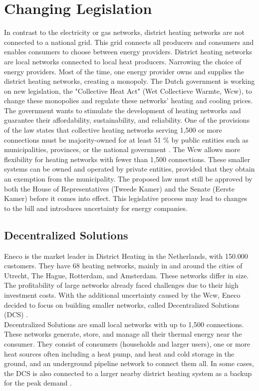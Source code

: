 \section{Changing Legislation}
In contrast to the electricity or gas networks, district heating networks are not connected to a national grid. This grid connects all producers and consumers and enables consumers to choose between energy providers. District heating networks are local networks connected to local heat producers. Narrowing the choice of energy providers. Most of the time, one energy provider owns and supplies the district heating networks, creating a monopoly. The Dutch government is working on new legislation, the "Collective Heat Act" (Wet Collectieve Warmte, Wcw), to change these monopolies and regulate these networks' heating and cooling prices. The government wants to stimulate the development of heating networks and guarantee their affordability, sustainability, and reliability. One of the provisions of the law states that collective heating networks serving 1,500 or more connections must be majority-owned for at least 51 $\%$ by public entities such as municipalities, provinces, or the national government \cite{WcWsite}. The Wcw allows more flexibility for heating networks with fewer than 1,500 connections. These smaller systems can be owned and operated by private entities, provided that they obtain an exemption from the municipality. The proposed law
must still be approved by both the House of Representatives (Tweede Kamer) and the Senate (Eerste Kamer) before it comes into effect. This legislative process may lead to changes to the bill and introduces uncertainty for energy companies.

\subsection{Decentralized Solutions}
Eneco is the market leader in District Heating in the Netherlands, with 150.000 customers. They have 68 heating networks, mainly in and around the cities of Utrecht, The Hague, Rotterdam, and Amsterdam. These networks differ in size. The profitability of large networks already faced challenges due to their high investment costs. With the additional uncertainty caused by the Wcw, Eneco decided to focus on building smaller networks, called Decentralized Solutions (DCS) \cite{nos2025warmtenetten}. \\

Decentralized Solutions are small local networks with up to 1,500 connections. These networks generate, store, and manage all their thermal energy near the consumer. They consist of consumers (households and larger users), one or more heat sources often including a heat pump, and heat and cold storage in the ground, and an underground pipeline network to connect them all. In some cases, the DCS is also connected to a larger nearby district heating system as a backup for the peak demand \cite{opdracht_eneco}.

